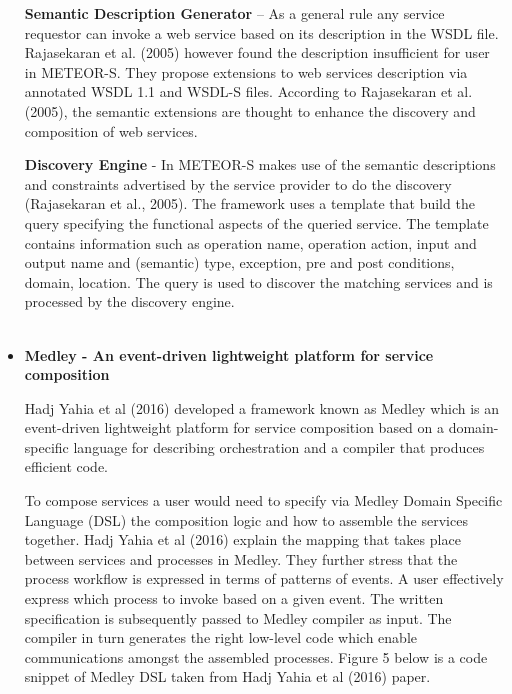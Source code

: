\documentclass{article}
\begin{document}
\begin{itemize}
\textbf{Semantic Description Generator} – As a general rule any service requestor can invoke a web service based on its description in the WSDL file. Rajasekaran et al. (2005) however found the description insufficient for user in METEOR-S. They propose extensions to web services description via annotated WSDL 1.1 and WSDL-S files. According to Rajasekaran et al. (2005), the semantic extensions are thought to enhance the discovery and composition of web services. 

\textbf{Discovery Engine} - In METEOR-S makes use of the semantic descriptions and constraints advertised by the service provider to do the discovery (Rajasekaran et al., 2005). The framework uses a template that build the query specifying the functional aspects of the queried service. The template contains information such as operation name, operation action, input and output name and (semantic) type, exception, pre and post conditions, domain, location. The query is used to discover the matching services and is processed by the discovery engine. 
\\
\\
\item \textbf{Medley - An event-driven lightweight platform for service composition} 

Hadj Yahia et al (2016) developed a framework known as Medley which is an event-driven lightweight platform for service composition based on a domain-specific language for describing orchestration and a compiler that produces efficient code. 

To compose services a user would need to specify via Medley Domain Specific Language (DSL) the composition logic and how to assemble the services together. Hadj Yahia et al (2016) explain the mapping that takes place between services and processes in Medley. They further stress that the process workflow is expressed in terms of patterns of events. A user effectively express which process to invoke based on a given event. The written specification is subsequently passed to Medley compiler as input.  The compiler in turn generates the right low-level code which enable communications amongst the assembled processes. Figure 5 below is a code snippet of Medley DSL taken from Hadj Yahia et al (2016) paper.


\end{itemize}
\end{document}
